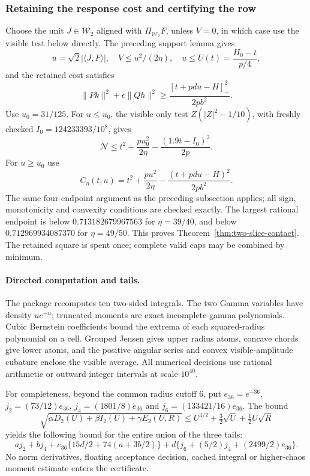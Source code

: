 \subsubsection{Retaining the response cost and certifying the row}
Choose the unit $J\in\mathcal W_2$ aligned with
$\Pi_{\mathcal W_2}F$, unless $V=0$, in which case use the visible
test below directly. The preceding support lemma gives
\[
 u=\sqrt2|\langle J,F\rangle|,\quad V\le u^2/(2\eta),\quad
 u\le U(t)=\frac{H_0-t}{p/4},
\]
and the retained cost satisfies
\[
 \|Pk\|^2+\epsilon\|Qh\|^2
   \ge\frac{[t+pdu-H]_+^2}{2pb^2}.
\]
Use $u_0=31/125$. For $u\le u_0$, the visible-only test
$Z(|Z|^2-1/10)$, with freshly checked
$I_0=124233393/10^8$, gives
\[
 \mathcal N\le t^2+\frac{pu_0^2}{2\eta}
                 -\frac{(1.9t-I_0)^2}{2p}.
\]
For $u\ge u_0$ use
\[
 C_\eta(t,u)=t^2+\frac{pu^2}{2\eta}
                 -\frac{(t+pdu-H)^2}{2pb^2}.
\]
The same four-endpoint argument as the preceding subsection applies;
all sign, monotonicity and convexity conditions are checked exactly.
The largest rational endpoint is below $0.713182679967563$ for
$\eta=39/40$, and below $0.712969934087370$ for $\eta=49/50$.
This proves Theorem~\ref{thm:two-slice-contact}. The retained square
is spent once; complete valid caps may be combined by minimum.

\paragraph{Directed computation and tails.}
The package recomputes ten two-sided integrals. The two Gamma variables
have density $ue^{-u}$; truncated moments are exact incomplete-gamma
polynomials. Cubic Bernstein coefficients bound the extrema of each
squared-radius polynomial on a cell. Grouped Jensen gives upper
radius atoms, concave chords give lower atoms, and the positive angular
series and convex visible-amplitude cubature enclose the visible
average. All numerical decisions use rational arithmetic or outward
integer intervals at scale $10^{40}$.

For completeness, beyond the common radius cutoff $6$, put
$e_{36}=e^{-36}$, $j_2=(73/12)e_{36}$,
$j_4=(1801/8)e_{36}$ and $j_6=(133421/16)e_{36}$.
The bound
\[
 \sqrt{\alpha D_2(U)+\beta I_2(U)+\gamma E_2(U,R)}
 \le U^{3/2}+\tfrac32\sqrt U+\tfrac12U\sqrt R
\]
yields the following bound for the entire union of the three tails:
\[
 a j_2+b j_4+e_{36}\{15d/2+74(a+3b/2)\}
       +d\{j_6+(5/2)j_4+(2499/2)e_{36}\}.
\]
No norm derivatives, floating acceptance decision, cached integral or
higher-chaos moment estimate enters the certificate.

